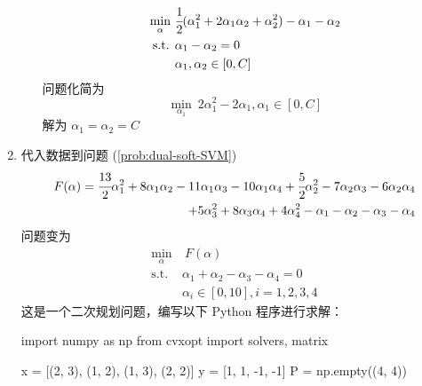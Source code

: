 \documentclass[11pt,letter,notitlepage]{article}
\begin{document}
\begin{solution}
\begin{enumerate}
\begin{enumerate}
$$\begin{aligned}
					            \min_{\alpha}\  & \cfrac{1}{2}(\alpha_1^2+2\alpha_1 \alpha_2 +\alpha_2^2)-\alpha_1-\alpha_2 \\
					            \mbox{s.t. }    & \alpha_1-\alpha_2=0                                                       \\
					                            & \alpha_1,\alpha_2 \in [0,C]
				            \end{aligned}$$
			            问题化简为
			            $$\min_{\alpha_1}\ 2\alpha_1^2-2\alpha_1, \alpha_1\in[0,C]$$
			            解为 $\alpha_1=\alpha_2=C$
		      \end{enumerate}
		\item 代入数据到问题 (\ref{prob:dual-soft-SVM})
		      $$\begin{aligned}
				      F(\alpha)
				      =\cfrac{13}{2}\alpha_1^2+8\alpha_1\alpha_2 -11\alpha_1\alpha_3 -10\alpha_1\alpha_4
				      +\cfrac{5}{2}\alpha_2^2-7\alpha_2\alpha_3 -6\alpha_2\alpha_4 \\
				      +5\alpha_3^2+8\alpha_3\alpha_4
				      +4\alpha_4^2
				      -\alpha_1-\alpha_2-\alpha_3-\alpha_4
			      \end{aligned}$$
		      问题变为
		      $$\begin{aligned}
				      \min_{\alpha} & \ F(\alpha)                             \\
				      \mbox{s.t. }  & \alpha_1+\alpha_2 -\alpha_3 -\alpha_4=0 \\
				                    & \alpha_i \in [0,10], i=1,2,3,4
			      \end{aligned}$$
		      这是一个二次规划问题，编写以下 Python 程序进行求解：
		      \begin{python}
			      import numpy as np
			      from cvxopt import solvers, matrix

			      x = [(2, 3), (1, 2), (1, 3), (2, 2)]
			      y = [1, 1, -1, -1]
			      P = np.empty((4, 4))


\end{python}
\end{enumerate}
\end{solution}
\end{document}
